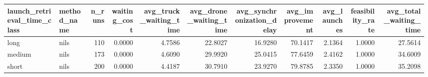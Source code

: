 \begin{tabular}{llrrrrrrrrr}
\toprule
launch_retrieval_time_class & method_name & n_runs & waiting_cost & avg_truck_waiting_time & avg_drone_waiting_time & avg_synchronization_delay & avg_improvement & avg_launches & feasibility_rate & avg_total_waiting_time \\
\midrule
long & nils & 110 & 0.0000 & 4.7586 & 22.8027 & 16.9280 & 70.1417 & 2.1364 & 1.0000 & 27.5614 \\
medium & nils & 173 & 0.0000 & 4.6090 & 29.9920 & 25.0415 & 77.6459 & 2.4162 & 1.0000 & 34.6009 \\
short & nils & 200 & 0.0000 & 4.4187 & 30.7910 & 23.9270 & 79.8785 & 2.3350 & 1.0000 & 35.2098 \\
\bottomrule
\end{tabular}
